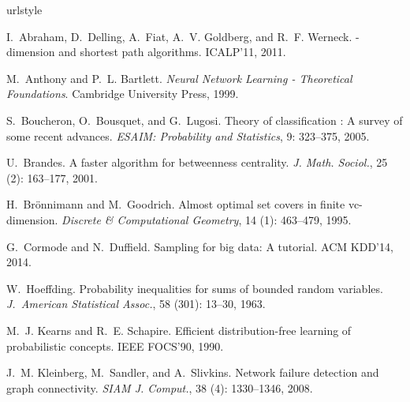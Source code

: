 \documentclass{sig-alternate-2013}
\begin{document}
%
%
\begin{thebibliography}{17}
\providecommand{\natexlab}[1]{#1}
\providecommand{\url}[1]{\texttt{#1}}
\expandafter\ifx\csname urlstyle\endcsname\relax
  \providecommand{\doi}[1]{doi: #1}\else
  \providecommand{\doi}{doi: \begingroup \urlstyle{rm}\Url}\fi

I.~Abraham, D.~Delling, A.~Fiat, A.~V. Goldberg, and R.~F. Werneck.
-dimension and shortest path algorithms.
\newblock ICALP'11, 2011.

M.~Anthony and P.~L. Bartlett.
\newblock \emph{Neural Network Learning - Theoretical Foundations}.
\newblock Cambridge University Press, 1999.

S.~Boucheron, O.~Bousquet, and G.~Lugosi.
\newblock Theory of classification : A survey of some recent advances.
\newblock \emph{{ESAIM}: Probability and Statistics}, 9: 323--375,
  2005.

U.~Brandes.
\newblock A faster algorithm for betweenness centrality.
\newblock \emph{J. Math. Sociol.}, 25 (2): 163--177, 2001.

H.~Br{\"o}nnimann and M.~Goodrich.
\newblock Almost optimal set covers in finite vc-dimension.
\newblock \emph{Discrete \& Computational Geometry}, 14 (1):
  463--479, 1995.

G.~Cormode and N.~Duffield.
\newblock Sampling for big data: A tutorial.
\newblock ACM KDD'14, 2014.

W.~Hoeffding.
\newblock Probability inequalities for sums of bounded random variables.
\newblock \emph{J.~American Statistical Assoc.}, 58 (301):
  13--30, 1963.

M.~J. Kearns and R.~E. Schapire.
\newblock Efficient distribution-free learning of probabilistic concepts.
\newblock IEEE FOCS'90, 1990.

J.~M. Kleinberg, M.~Sandler, and A.~Slivkins.
\newblock Network failure detection and graph connectivity.
\newblock \emph{SIAM J. Comput.}, 38 (4): 1330--1346, 2008.


\end{thebibliography}
\end{document}
